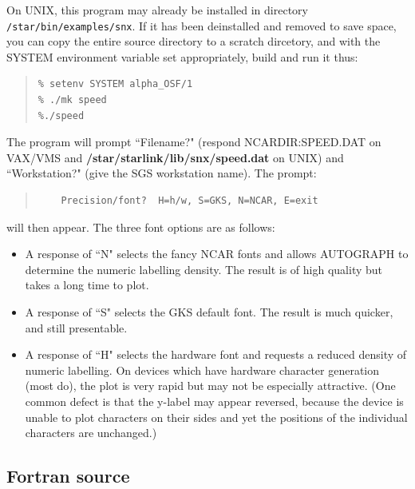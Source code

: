 \documentclass[twoside,11pt]{article}
\renewcommand{\_}{\texttt{\symbol{95}}}
\begin{document}
On UNIX, this program may already be installed in directory 
{\tt /star/bin/examples/snx}.  If it has been deinstalled and removed to save
space, you can copy the entire source directory to a scratch dircetory, and
with the SYSTEM environment variable set appropriately, build and run it thus:

\begin {quote}
\begin{verbatim}
% setenv SYSTEM alpha_OSF/1
% ./mk speed
%./speed
\end{verbatim}
\end {quote}


The program will prompt ``Filename?" (respond NCAR\_DIR:SPEED.DAT on VAX/VMS
and {\bf /star/\-starlink/\-lib/\-snx/speed.dat} on UNIX) and ``Workstation?" 
(give the SGS workstation name). 
The prompt:

\begin {quote}
\begin{verbatim}
    Precision/font?  H=h/w, S=GKS, N=NCAR, E=exit
\end{verbatim}
\end {quote}

will then appear.
The three font options are as follows:

\begin{itemize}
\item A response of ``N" selects the fancy NCAR fonts and allows
AUTOGRAPH to determine the numeric labelling density.
The result is of high quality but takes a long time to plot.
\item A response of ``S" selects the GKS default font.
The result is much quicker, and still presentable.
\item A response of ``H" selects the hardware font and requests
a reduced density of numeric labelling.
On devices which have hardware character generation (most do),
the plot is very rapid but may not be especially attractive.
(One common defect is that the y-label may appear reversed, because the
device is unable to plot characters on their sides and yet the
positions of the individual characters are unchanged.)
\end{itemize}


\subsection {Fortran source}
\end{document}
